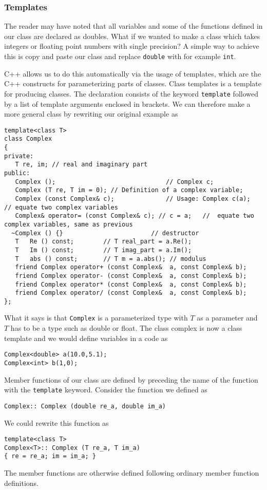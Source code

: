 \subsubsection{Templates}

The reader may have noted that all variables and some of the functions defined in
our class are declared as doubles.  What if we wanted to make a class which takes integers
or floating point numbers with single precision?
A simple way to achieve this is copy and paste our class and replace \verb?double? with for
example \verb?int?.

C++  allows us to do this automatically via the usage of templates, which 
are the C++ constructs for parameterizing parts of
classes. Class templates  is a template for producing classes. The declaration consists
of the keyword \verb?template? followed by a list of template arguments enclosed in brackets.
We can therefore make a more general class by rewriting our original example as
\begin{lstlisting}
template<class T>
class Complex
{
private:
   T re, im; // real and imaginary part
public:
   Complex ();                              // Complex c;
   Complex (T re, T im = 0); // Definition of a complex variable;
   Complex (const Complex& c);              // Usage: Complex c(a);   // equate two complex variables
   Complex& operator= (const Complex& c); // c = a;   //  equate two complex variables, same as previous
  ~Complex () {}                        // destructor
   T   Re () const;        // T real_part = a.Re();
   T   Im () const;        // T imag_part = a.Im();
   T   abs () const;       // T m = a.abs(); // modulus
   friend Complex operator+ (const Complex&  a, const Complex& b);
   friend Complex operator- (const Complex&  a, const Complex& b);
   friend Complex operator* (const Complex&  a, const Complex& b);
   friend Complex operator/ (const Complex&  a, const Complex& b);
};
\end{lstlisting}
What it says is that \verb?Complex? is a parameterized type with $T$ as a parameter and $T$ 
has to be a type such as double
or float. 
The class complex is now a class template
and we would define variables in a code as 
\begin{lstlisting}
Complex<double> a(10.0,5.1);
Complex<int> b(1,0);
\end{lstlisting}

Member functions of our class are defined by preceding the name of the function with the \verb?template? keyword. 
Consider the function we defined as 
\begin{lstlisting}
Complex:: Complex (double re_a, double im_a)
\end{lstlisting}
We could rewrite this function as 
\begin{lstlisting}
template<class T>
Complex<T>:: Complex (T re_a, T im_a)
{ re = re_a; im = im_a; }
\end{lstlisting}
The member functions  are otherwise defined following ordinary member function definitions.


